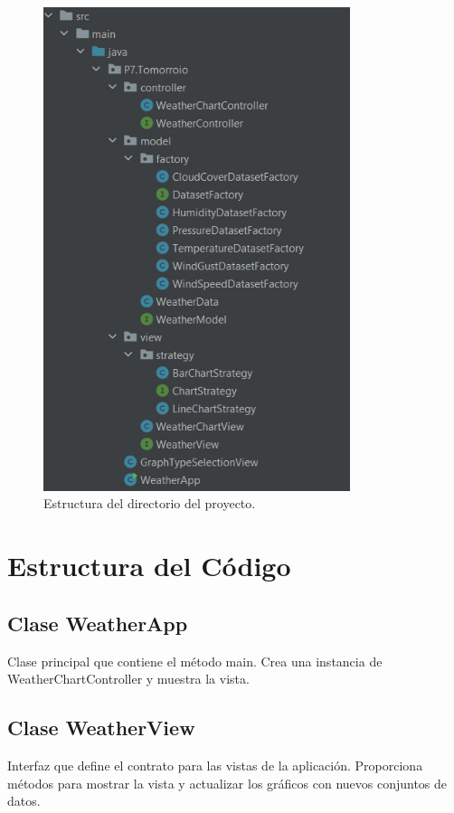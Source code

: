 \documentclass{article}
\begin{document}
\begin{figure}[H]
  \centering
  \includegraphics[width=0.8\textwidth]{images/image6.png}
  \caption{Estructura del directorio del proyecto.}
  \label{fig:estructura-proyecto}
\end{figure}

\section{Estructura del Código}
\subsection{Clase WeatherApp}
Clase principal que contiene el método main. Crea una instancia de WeatherChartController y muestra la vista.

\subsection{Clase WeatherView}
Interfaz que define el contrato para las vistas de la aplicación. Proporciona métodos para mostrar la vista y actualizar los gráficos con nuevos conjuntos de datos.
\end{document}
